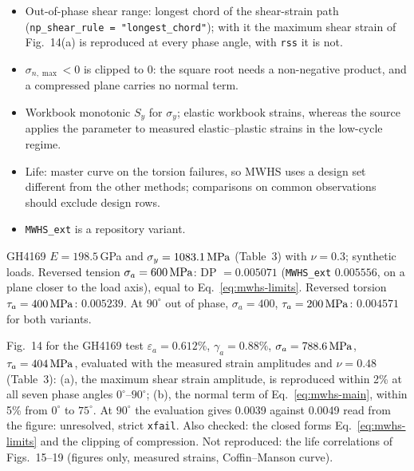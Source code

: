\begin{itemize}
\item Out-of-phase shear range: longest chord of the shear-strain path
  (\texttt{np\_shear\_rule = "longest\_chord"}); with it the maximum shear strain of Fig.~14(a) is
  reproduced at every phase angle, with \texttt{rss} it is not.
\item $\sigma_{n,\max}<0$ is clipped to 0: the square root needs a non-negative product, and a
  compressed plane carries no normal term.
\item Workbook monotonic $S_y$ for $\sigma_y$; elastic workbook strains, whereas the source applies
  the parameter to measured elastic--plastic strains in the low-cycle regime.
\item Life: master curve on the torsion failures, so MWHS uses a design set different from the other
  methods; comparisons on common observations should exclude design rows.
\item \texttt{MWHS\_ext} is a repository variant.
\end{itemize}

 GH4169 $E=198.5$\,GPa and $\sigma_y=1083.1\,\mathrm{MPa}$ (Table~3) with $\nu=0.3$;
synthetic loads. Reversed tension $\sigma_a=600\,\mathrm{MPa}$: DP $=0.005071$ (\texttt{MWHS\_ext}
$0.005556$, on a plane closer to the load axis), equal to Eq.~\eqref{eq:mwhs-limits}. Reversed torsion
$\tau_a=400\,\mathrm{MPa}$: $0.005239$. At $90^\circ$ out of phase, $\sigma_a=400$, $\tau_a=200\,\mathrm{MPa}$: $0.004571$
for both variants.

 Fig.~14 for the GH4169 test $\varepsilon_a=0.612\%$, $\gamma_a=0.88\%$,
$\sigma_a=788.6\,\mathrm{MPa}$, $\tau_a=404\,\mathrm{MPa}$, evaluated with the measured strain amplitudes and $\nu=0.48$
(Table~3): (a), the maximum shear strain amplitude, is reproduced within 2\% at all seven phase
angles $0^\circ$--$90^\circ$; (b), the normal term of Eq.~\eqref{eq:mwhs-main}, within 5\% from
$0^\circ$ to $75^\circ$. At $90^\circ$ the evaluation gives 0.0039 against 0.0049 read from the
figure: unresolved, strict \texttt{xfail}. Also checked: the closed forms
Eq.~\eqref{eq:mwhs-limits} and the clipping of compression. Not reproduced: the life correlations
of Figs.~15--19 (figures only, measured strains, Coffin--Manson curve).
